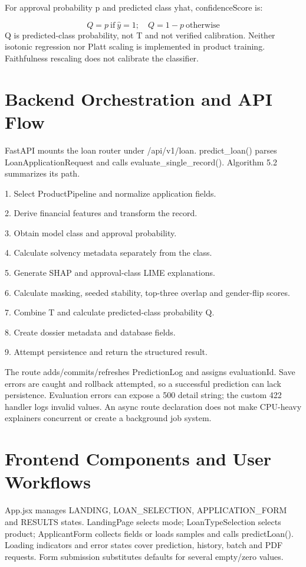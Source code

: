 \documentclass[12pt,a4paper]{report}
\begin{document}
For approval probability p and predicted class yhat, confidenceScore is:

\begin{equation}Q=p\ \mathrm{if}\ \hat{y}=1;\quad Q=1-p\ \mathrm{otherwise}\end{equation}
Q is predicted-class probability, not T and not verified calibration. Neither isotonic regression nor Platt scaling is implemented in product training. Faithfulness rescaling does not calibrate the classifier.

\section{Backend Orchestration and API Flow}
FastAPI mounts the loan router under /api/v1/loan. predict\_loan() parses LoanApplicationRequest and calls evaluate\_single\_record(). Algorithm 5.2 summarizes its path.

1. Select ProductPipeline and normalize application fields.

2. Derive financial features and transform the record.

3. Obtain model class and approval probability.

4. Calculate solvency metadata separately from the class.

5. Generate SHAP and approval-class LIME explanations.

6. Calculate masking, seeded stability, top-three overlap and gender-flip scores.

7. Combine T and calculate predicted-class probability Q.

8. Create dossier metadata and database fields.

9. Attempt persistence and return the structured result.

The route adds/commits/refreshes PredictionLog and assigns evaluationId. Save errors are caught and rollback attempted, so a successful prediction can lack persistence. Evaluation errors can expose a 500 detail string; the custom 422 handler logs invalid values. An async route declaration does not make CPU-heavy explainers concurrent or create a background job system.

\section{Frontend Components and User Workflows}
App.jsx manages LANDING, LOAN\_SELECTION, APPLICATION\_FORM and RESULTS states. LandingPage selects mode; LoanTypeSelection selects product; ApplicantForm collects fields or loads samples and calls predictLoan(). Loading indicators and error states cover prediction, history, batch and PDF requests. Form submission substitutes defaults for several empty/zero values.
\end{document}
